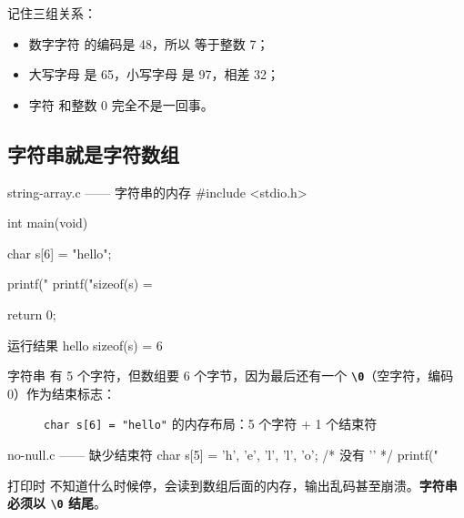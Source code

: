 记住三组关系：

\begin{itemize}
  \item 数字字符  的编码是 48，所以  等于整数 7；
  \item 大写字母  是 65，小写字母  是 97，相差 32；
  \item 字符  和整数 0 完全不是一回事。
\end{itemize}

\subsection{字符串就是字符数组}

\begin{codebox}{string-array.c —— 字符串的内存}
#include <stdio.h>

int main(void)
{
    char s[6] = "hello";

    printf("%
    printf("sizeof(s) = %

    return 0;
}
\end{codebox}

\begin{outbox}{运行结果}
hello
sizeof(s) = 6
\end{outbox}

字符串  有 5 个字符，但数组要 6 个字节，因为最后还有一个 \textbf{\texttt{\textbackslash0}}（空字符，编码 0）作为结束标志：

\begin{figure}[htbp]
  \centering
  \caption{\texttt{char s[6] = "hello"} 的内存布局：5 个字符 + 1 个结束符}
  \label{fig:string-memory}
\end{figure}

\begin{pitfall}
\begin{codebox}{no-null.c —— 缺少结束符}
char s[5] = {'h', 'e', 'l', 'l', 'o'};   /* 没有 '\0' */
printf("%
\end{codebox}
打印时  不知道什么时候停，会读到数组后面的内存，输出乱码甚至崩溃。\textbf{字符串必须以 \texttt{\textbackslash0} 结尾}。
\end{pitfall}

